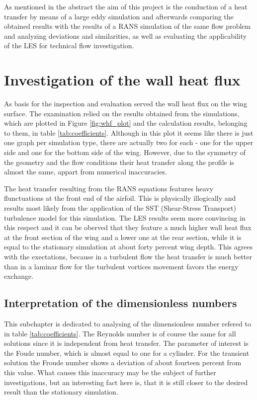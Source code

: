 As mentioned in the abstract the aim of this project is the conduction of a heat transfer by means of a large eddy simulation and afterwards comparing the obtained results with the results of a RANS simulation of the same flow problem and analyzing deviations and similarities, as well as evaluating the applicability of the LES for technical flow investigation.

\section{Investigation of the wall heat flux}
As basis for the inspection and evaluation served the wall heat flux on the wing surface. The examination relied on the results obtained from the simulations, which are plotted in Figure \ref{fig:whf_plot} and the calculation results, belonging to them, in table \ref{tab:coefficients}. Although in this plot it seems like there is just one graph per simulation type, there are actually two for each - one for the upper side and one for the bottom side of the wing. However, due to the symmetry of the geometry and the flow conditions their heat transfer along the profile is almost the same, appart from numerical inaccuracies.
	
The heat transfer resulting from the RANS equations features heavy flunctuations at the front end of the airfoil. This is physically illogically and results most likely from the application of the SST (Shear-Stress Transport) turbulence model for this simulation. The LES results seem more convincing in this respect and it can be oberved that they feature a much higher wall heat flux at the front section of the wing and a lower one at the rear section, while it is equal to the stationary simulation at about forty percent wing depth. This agrees with the exectations, because in a turbulent flow the heat transfer is much better than in a laminar flow for the turbulent vortices movement favors the energy exchange.
\subsection{Interpretation of the dimensionless numbers}
This subchapter is dedicated to analysing of the dimensionless number refered to in table \ref{tab:coefficients}. The Reynolds number is of course the same for all solutions since it is independent from heat transfer.
The parameter of interest is the Foude number, which is almost equal to one for a cylinder. For the transient solution the Froude number shows a deviation of about fourteen percent from this value. What causes this inaccuracy may be the subject of further investigations, but an interesting fact here is, that it is still closer to the desired result than the stationary simulation.
